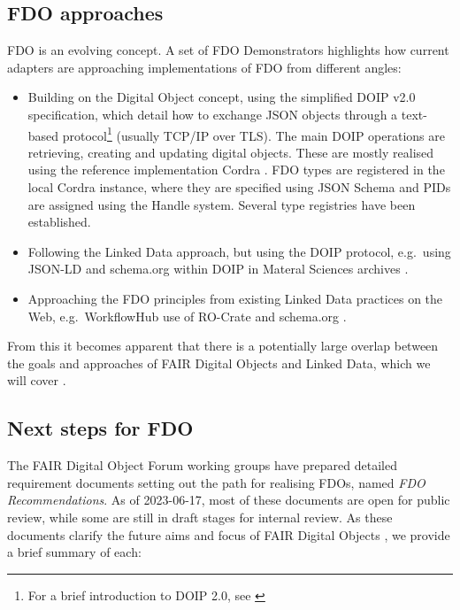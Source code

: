 \subsection{FDO approaches}\label{ch3:fdo-approaches}

FDO is an evolving concept. A set of FDO Demonstrators \cite{wittenburgFAIRDigitalObject2022b} highlights how current adapters are approaching implementations of FDO from different angles:

\begin{itemize}
\tightlist
\item
  Building on the Digital Object concept, using the simplified DOIP v2.0 \cite{DONA 2018} specification, which detail how to exchange JSON objects through a text-based protocol\footnote{For a brief introduction to DOIP 2.0, see \cite{DOIPExamplesCordraa}} (usually TCP/IP over TLS). The main DOIP operations are retrieving, creating and updating digital objects. These are mostly realised using the reference implementation Cordra \cite{tupelo-schneckrobertBriefIntroductionCordra2022}. FDO types are registered in the local Cordra instance, where they are specified using JSON Schema \cite{Draftbhuttonjsonschema} and PIDs are assigned using the Handle system. Several type registries have been established.
\item
  Following the Linked Data approach, but using the DOIP protocol, e.g.~using JSON-LD and schema.org within DOIP in Materal Sciences archives \cite{10.1002/jcc.26842}.
\item
  Approaching the FDO principles from existing Linked Data practices on the Web, e.g.~WorkflowHub use of RO-Crate and schema.org \cite{10.3897/rio.8.e93937}.
\end{itemize}

From this it becomes apparent that there is a potentially large overlap between the goals and approaches of FAIR Digital Objects and Linked Data, which we will cover .


\subsection{Next steps for FDO}\label{ch3:next-step-fdo}

The FAIR Digital Object Forum \cite{FAIRDigitalObjects} working groups have prepared detailed requirement documents \cite{fdo-Specs} setting out the path for realising FDOs, named \emph{FDO Recommendations}. As of 2023-06-17, most of these documents are open for public review, while some are still in draft stages for internal review. As these documents clarify the future aims and focus of FAIR Digital Objects \cite{fdo-Roadmap}, we provide a brief summary of each:

